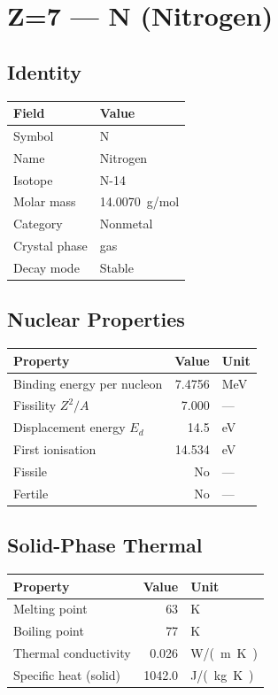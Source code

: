 \documentclass[11pt,a4paper]{article}
\begin{document}
\newpage

\section{Z=7 --- N (Nitrogen)}
\label{sec:Z7}

\subsection{Identity}
\begin{tabular}{ll}
  \toprule
  Field & Value \\
  \midrule
  Symbol & N \\
  Name & Nitrogen \\
  Isotope & N-14 \\
  Molar mass & \SI{14.0070}{g/mol} \\
  Category & Nonmetal \\
  Crystal phase & gas \\
  Decay mode & Stable \\
  \bottomrule
\end{tabular}

\subsection{Nuclear Properties}
\begin{tabular}{lrl}
  \toprule
  Property & Value & Unit \\
  \midrule
  Binding energy per nucleon & 7.4756 & \si{MeV} \\
  Fissility $Z^2/A$ & 7.000 & --- \\
  Displacement energy $E_d$ & 14.5 & \si{eV} \\
  First ionisation & 14.534 & \si{eV} \\
  Fissile & No & --- \\
  Fertile & No & --- \\
  \bottomrule
\end{tabular}

\subsection{Solid-Phase Thermal}
\begin{tabular}{lrl}
  \toprule
  Property & Value & Unit \\
  \midrule
  Melting point & 63 & \si{K} \\
  Boiling point & 77 & \si{K} \\
  Thermal conductivity & 0.026 & \si{W/(m.K)} \\
  Specific heat (solid) & 1042.0 & \si{J/(kg.K)} \\
  \bottomrule
\end{tabular}
\end{document}
